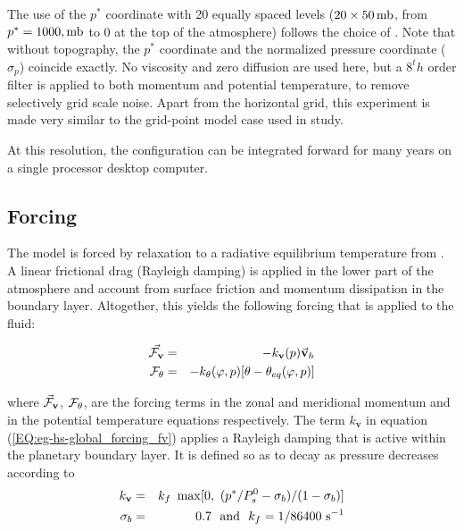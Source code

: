 The use of the $p^*$ coordinate with 20 equally spaced levels
($20 \times 50\,{\rm mb}$, from $p^*=1000,{\rm mb}$ to $0$ at the 
top of the atmosphere) follows the choice of \cite{held-suar:94}. 
Note that without topography, the $p^*$ coordinate and the normalized 
pressure coordinate ($\sigma_p$) coincide exactly.
No viscosity and zero diffusion are used here, but
a $8^th$ order \cite{Shapiro_70} filter is applied to both momentum and
potential temperature, to remove selectively grid scale noise.
Apart from the horizontal grid, this experiment is made very similar to
the grid-point model case used in \cite{held-suar:94} study.

At this resolution, the configuration can be integrated forward 
for many years on a single processor desktop computer.
\\

\subsection{Forcing}
\label{www:tutorials}

The model is forced by relaxation to a radiative equilibrium temperature from
\cite{held-suar:94}.
A linear frictional drag (Rayleigh damping) is applied in the lower 
part of the atmosphere and account from surface friction and momentum
dissipation in the boundary layer.
Altogether, this yields the following forcing 
\cite[from][]{held-suar:94} that is applied to the fluid:

\begin{eqnarray}
\label{EQ:eg-hs-global_forcing}
\label{EQ:eg-hs-global_forcing_fv}
\vec{{\cal F}_\mathbf{v}} & = & -k_\mathbf{v}(p)\vec{\mathbf{v}}_h
\\
\label{EQ:eg-hs-global_forcing_ft}
{\cal F}_{\theta} & = & -k_{\theta}(\varphi,p)[\theta-\theta_{eq}(\varphi,p)]
\end{eqnarray}

\noindent where $\vec{\cal F}_\mathbf{v}$, ${\cal F}_{\theta}$,
are the forcing terms in the zonal and meridional
momentum and in the potential temperature equations respectively.
The term $k_\mathbf{v}$ in equation (\ref{EQ:eg-hs-global_forcing_fv}) applies a
Rayleigh damping that is active within the planetary boundary layer. 
It is defined so as to decay as pressure decreases according to
\begin{eqnarray*}
\label{EQ:eg-hs-define_kv}
k_\mathbf{v} & = & k_{f}~\max[0,~(p^*/P^{0}_{s}-\sigma_{b})/(1-\sigma_{b})]
\\
\sigma_{b} & = & 0.7 ~~{\rm and}~~
k_{f}  =  1/86400 ~{\rm s}^{-1}
\end{eqnarray*}

